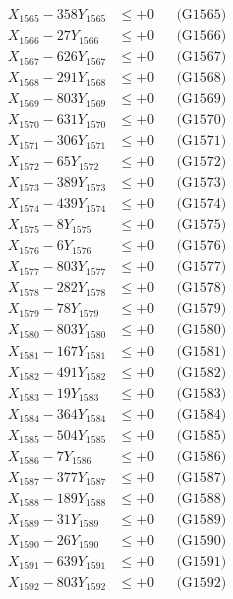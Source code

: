 \documentclass[a4paper,10pt]{article}
\begin{document}
{\begin{align}
X_{1565} - 358Y_{1565} &\leq +0 && \text{(G1565)} \\
X_{1566} - 27Y_{1566} &\leq +0 && \text{(G1566)} \\
X_{1567} - 626Y_{1567} &\leq +0 && \text{(G1567)} \\
X_{1568} - 291Y_{1568} &\leq +0 && \text{(G1568)} \\
X_{1569} - 803Y_{1569} &\leq +0 && \text{(G1569)} \\
X_{1570} - 631Y_{1570} &\leq +0 && \text{(G1570)} \\
\allowbreak
X_{1571} - 306Y_{1571} &\leq +0 && \text{(G1571)} \\
X_{1572} - 65Y_{1572} &\leq +0 && \text{(G1572)} \\
X_{1573} - 389Y_{1573} &\leq +0 && \text{(G1573)} \\
X_{1574} - 439Y_{1574} &\leq +0 && \text{(G1574)} \\
X_{1575} - 8Y_{1575} &\leq +0 && \text{(G1575)} \\
X_{1576} - 6Y_{1576} &\leq +0 && \text{(G1576)} \\
X_{1577} - 803Y_{1577} &\leq +0 && \text{(G1577)} \\
X_{1578} - 282Y_{1578} &\leq +0 && \text{(G1578)} \\
X_{1579} - 78Y_{1579} &\leq +0 && \text{(G1579)} \\
X_{1580} - 803Y_{1580} &\leq +0 && \text{(G1580)} \\
\allowbreak
X_{1581} - 167Y_{1581} &\leq +0 && \text{(G1581)} \\
X_{1582} - 491Y_{1582} &\leq +0 && \text{(G1582)} \\
X_{1583} - 19Y_{1583} &\leq +0 && \text{(G1583)} \\
X_{1584} - 364Y_{1584} &\leq +0 && \text{(G1584)} \\
X_{1585} - 504Y_{1585} &\leq +0 && \text{(G1585)} \\
X_{1586} - 7Y_{1586} &\leq +0 && \text{(G1586)} \\
X_{1587} - 377Y_{1587} &\leq +0 && \text{(G1587)} \\
X_{1588} - 189Y_{1588} &\leq +0 && \text{(G1588)} \\
X_{1589} - 31Y_{1589} &\leq +0 && \text{(G1589)} \\
X_{1590} - 26Y_{1590} &\leq +0 && \text{(G1590)} \\
\allowbreak
X_{1591} - 639Y_{1591} &\leq +0 && \text{(G1591)} \\
X_{1592} - 803Y_{1592} &\leq +0 && \text{(G1592)} \\

\end{align}}
\end{document}
